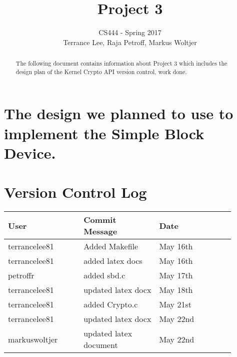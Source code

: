 \documentclass[draftclsnofoot,onecolumn,10pt,compsoc]{IEEEtran}
\begin{document}
\begin{titlepage}
	\title{Project 3}
	\author{CS444 - Spring 2017 \\ Terrance Lee, Raja Petroff, Markus Woltjer}
	\maketitle
	\begin{abstract}
		The following document contains information about Project 3 which includes the design plan of the Kernel Crypto API version control, work done.  
	\end{abstract}
	
	\thispagestyle{empty} %
	
\end{titlepage}

\tableofcontents

\newpage

\section{The design we planned to use to implement the Simple Block Device.}
\section{Version Control Log}
\begin{center}
	\begin{tabular}{| p{0.3\linewidth} | p{0.3\linewidth} | p{0.3\linewidth} |}
		\hline User & Commit Message & Date\\
		\hline terrancelee81 & Added Makefile & May 16th\\
		\hline terrancelee81 & added latex docs& May 16th\\
		\hline petroffr & added sbd.c & May 17th \\ 	
		\hline terrancelee81 & updated latex docx & May 18th\\
		\hline terrancelee81 & added Crypto.c & May 21st\\
		\hline terrancelee81 & updated latex docx & May 22nd\\
		\hline markuswoltjer & updated latex document & May 22nd\\
	\end{tabular}
\end{center}
\end{document}
